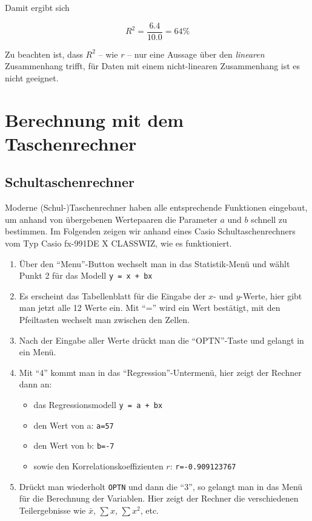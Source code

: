 \documentclass[ngerman, 12pt,parskip=half]{scrartcl}
\begin{document}
Damit ergibt sich

\begin{equation}
R^2 = \frac{6.4}{10.0} = 64 \%
\end{equation}


Zu beachten ist, dass \(R^2\) -- wie \(r\) -- nur eine Aussage über den \textit{linearen} Zusammenhang trifft, für Daten mit einem nicht-linearen Zusammenhang ist es nicht geeignet.

\section{Berechnung mit dem Taschenrechner}

\subsection{Schultaschenrechner}

Moderne (Schul-)Taschenrechner haben alle entsprechende Funktionen eingebaut, um anhand von übergebenen Wertepaaren die Parameter $a$ und $b$ schnell zu bestimmen. Im Folgenden zeigen wir anhand eines Casio Schultaschenrechners vom Typ Casio fx-991DE X CLASSWIZ, wie es funktioniert. 

\begin{enumerate}
	\item Über den \enquote{Menu}-Button wechselt man in das Statistik-Menü und wählt Punkt 2 für das Modell \texttt{y = x + bx}
	\item Es erscheint das Tabellenblatt für die Eingabe der $x$- und $y$-Werte, hier gibt man jetzt alle 12 Werte ein. Mit \enquote{=} wird ein Wert bestätigt, mit den Pfeiltasten wechselt man zwischen den Zellen.
	\item Nach der Eingabe aller Werte drückt man die \enquote{OPTN}-Taste und gelangt in ein Menü.
	\item Mit \enquote{4} kommt man in das \enquote{Regression}-Untermenü, hier zeigt der Rechner dann an:
	
	\begin{itemize}
		\item das Regressionsmodell \texttt{y = a + bx}
		\item den Wert von a: \texttt{a=57}
		\item den Wert von b: \texttt{b=-7}
		\item sowie den Korrelationskoeffizienten \(r\): \texttt{r=-0.909123767}
		\end{itemize}
	
	\item Drückt man wiederholt \texttt{OPTN} und dann die \enquote{3}, so gelangt man in das Menü für die Berechnung der Variablen. Hier zeigt der Rechner die verschiedenen Teilergebnisse wie \(\bar{x}\), \(\sum{x}\), \(\sum{x^2}\), etc.
	\end{enumerate}
\end{document}
